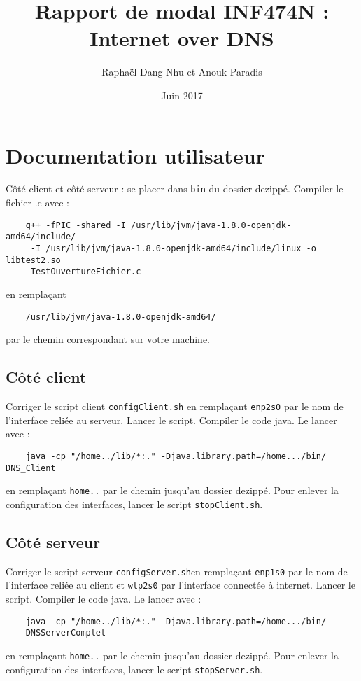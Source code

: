\documentclass[a4paper,12pt]{article}
\title {Rapport de modal INF474N : Internet over DNS}
\author{Raphaël Dang-Nhu et Anouk Paradis}
\date{Juin 2017}
\begin{document}
\maketitle

\section{Documentation utilisateur}
	Côté client et côté serveur : se placer dans \verb?bin? du dossier dezippé. Compiler le fichier .c avec :
	\begin{verbatim}
	g++ -fPIC -shared -I /usr/lib/jvm/java-1.8.0-openjdk-amd64/include/
	 -I /usr/lib/jvm/java-1.8.0-openjdk-amd64/include/linux -o libtest2.so 
	 TestOuvertureFichier.c
	\end{verbatim}
	en remplaçant 
	\begin{verbatim}
	/usr/lib/jvm/java-1.8.0-openjdk-amd64/
	\end{verbatim}
	par le chemin correspondant sur votre machine.
	
	\subsection{Côté client}
	Corriger le script client \verb?configClient.sh? en remplaçant \verb?enp2s0? par le nom de l'interface reliée au serveur. Lancer le script.\newline
	Compiler le code java. Le lancer avec :
	\begin{verbatim}
	java -cp "/home../lib/*:." -Djava.library.path=/home.../bin/ DNS_Client
	\end{verbatim}
	en remplaçant \verb?home..? par le chemin jusqu'au dossier dezippé.
	Pour enlever la configuration des interfaces, lancer le script \verb?stopClient.sh?.
	
	\subsection{Côté serveur}
	Corriger le script serveur \verb?configServer.sh?en remplaçant \verb?enp1s0? par le nom de l'interface reliée au client et \verb?wlp2s0? par l'interface connectée à internet. Lancer le script.
	Compiler le code java. Le lancer avec :
	\begin{verbatim}
	java -cp "/home../lib/*:." -Djava.library.path=/home.../bin/ 
	DNSServerComplet
	\end{verbatim}
	en remplaçant \verb?home..? par le chemin jusqu'au dossier dezippé.
	Pour enlever la configuration des interfaces, lancer le script \verb?stopServer.sh?.
	
\end{document}
